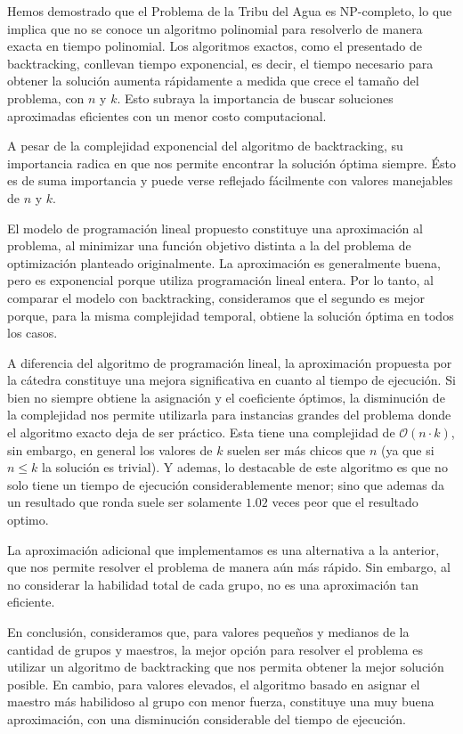 \documentclass{article}
\begin{document}
Hemos demostrado que el Problema de la Tribu del Agua es NP-completo, lo que implica que no se conoce un algoritmo polinomial para resolverlo de manera exacta en tiempo polinomial. Los algoritmos exactos, como el presentado de backtracking, conllevan tiempo exponencial, es decir, el tiempo necesario para obtener la solución aumenta rápidamente a medida que crece el tamaño del problema, con $n$ y $k$. Esto subraya la importancia de buscar soluciones aproximadas eficientes con un menor costo computacional.

A pesar de la complejidad exponencial del algoritmo de backtracking, su importancia radica en que nos permite encontrar la solución óptima siempre. Ésto es de suma importancia y puede verse reflejado fácilmente con valores manejables de $n$ y $k$.

El modelo de programación lineal propuesto constituye una aproximación al problema, al minimizar una función objetivo distinta a la del problema de optimización planteado originalmente. La aproximación es generalmente buena, pero es exponencial porque utiliza programación lineal entera. Por lo tanto, al comparar el modelo con backtracking, consideramos que el segundo es mejor porque, para la misma complejidad temporal, obtiene la solución óptima en todos los casos. 

A diferencia del algoritmo de programación lineal, la aproximación propuesta por la cátedra constituye una mejora significativa en cuanto al tiempo de ejecución. Si bien no siempre obtiene la asignación y el coeficiente óptimos, la disminución de la complejidad nos permite utilizarla para instancias grandes del problema donde el algoritmo exacto deja de ser práctico.
Esta tiene una complejidad de $\mathcal{O}(n \cdot k)$, sin embargo, en general los valores de $k$ suelen ser más chicos que $n$ (ya que si $n \leq k$ la solución es trivial). Y ademas, lo destacable de este algoritmo es que no solo tiene un tiempo de ejecución considerablemente menor; sino que ademas da un resultado que ronda suele ser solamente $1.02$ veces peor que el resultado optimo.

La aproximación adicional que implementamos es una alternativa a la anterior, que nos permite resolver el problema de manera aún más rápido. Sin embargo, al no considerar la habilidad total de cada grupo, no es una aproximación tan eficiente. 

En conclusión, consideramos que, para valores pequeños y medianos de la cantidad de grupos y maestros, la mejor opción para resolver el problema es utilizar un algoritmo de backtracking que nos permita obtener la mejor solución posible. En cambio, para valores elevados, el algoritmo basado en asignar el maestro más habilidoso al grupo con menor fuerza, constituye una muy buena aproximación, con una disminución considerable del tiempo de ejecución.
\end{document}
